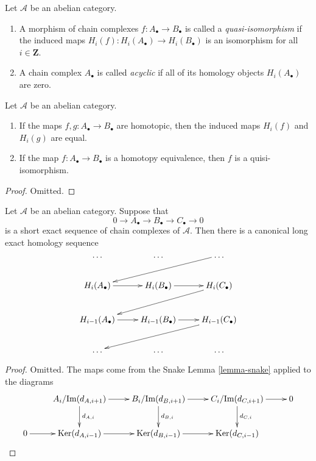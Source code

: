 \begin{definition}
\label{definition-quasi-isomorphism}
Let $\mathcal{A}$ be an abelian category.
\begin{enumerate}
\item A morphism of chain complexes $f : A_\bullet \to B_\bullet$
is called a {\it quasi-isomorphism} if the induced
maps $H_i(f) : H_i(A_\bullet) \to H_i(B_\bullet)$
is an isomorphism for all $i \in \mathbf{Z}$.
\item A chain complex $A_\bullet$ is called
{\it acyclic} if all of its homology objects
$H_i(A_\bullet)$ are zero.
\end{enumerate}
\end{definition}


\begin{lemma}
\label{lemma-map-homology-homotopy}
Let $\mathcal{A}$ be an abelian category.
\begin{enumerate}
\item If the maps $f, g : A_\bullet \to B_\bullet$ are
homotopic, then the induced maps $H_i(f)$ and $H_i(g)$
are equal.
\item If the map $f : A_\bullet \to B_\bullet$ is a homotopy
equivalence, then $f$ is a quisi-isomorphism.
\end{enumerate}
\end{lemma}

\begin{proof}
Omitted.
\end{proof}

\begin{lemma}
\label{lemma-long-exact-sequence-chain}
Let $\mathcal{A}$ be an abelian category.
Suppose that
$$
0 \to
A_\bullet \to
B_\bullet \to
C_\bullet \to
0
$$
is a short exact sequence of chain complexes of $\mathcal{A}$.
Then there is a canonical long exact homology sequence
$$
\xymatrix{
\ldots & \ldots & \dots \ar[lld] \\
H_i(A_\bullet) \ar[r] & H_i(B_\bullet) \ar[r] & H_i(C_\bullet) \ar[lld] \\
H_{i - 1}(A_\bullet) \ar[r] &
H_{i - 1}(B_\bullet) \ar[r] &
H_{i - 1}(C_\bullet) \ar[lld] \\
\ldots & \ldots & \dots \\
}
$$
\end{lemma}

\begin{proof}
Omitted. The maps come from the Snake Lemma \ref{lemma-snake}
applied to the diagrams
$$
\xymatrix{
&
A_i/\text{Im}(d_{A, i + 1}) \ar[r] \ar[d]^{d_{A, i}} &
B_i/\text{Im}(d_{B, i + 1}) \ar[r] \ar[d]^{d_{B, i}} &
C_i/\text{Im}(d_{C, i + 1}) \ar[r] \ar[d]^{d_{C, i}} &
0 \\
0 \ar[r] &
\text{Ker}(d_{A, i - 1}) \ar[r] &
\text{Ker}(d_{B, i - 1}) \ar[r] &
\text{Ker}(d_{C, i - 1}) &
}
$$
\end{proof}

